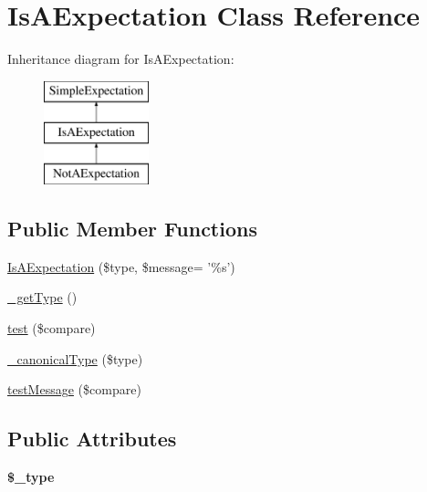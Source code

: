 \hypertarget{class_is_a_expectation}{
\section{IsAExpectation Class Reference}
\label{class_is_a_expectation}
}
Inheritance diagram for IsAExpectation:\begin{figure}[H]
\begin{center}
\leavevmode
\includegraphics[height=3.000000cm]{class_is_a_expectation}
\end{center}
\end{figure}
\subsection*{Public Member Functions}
\begin{DoxyCompactItemize}
\item 
\hyperlink{class_is_a_expectation_a7b8cdc05b6aff778baadf80c6835fba9}{IsAExpectation} (\$type, \$message= '\%s')
\item 
\hyperlink{class_is_a_expectation_adac32cda7734913a99895e0c39461822}{\_\-getType} ()
\item 
\hyperlink{class_is_a_expectation_a759f6a0c54751334dbb7a8aed01a3858}{test} (\$compare)
\item 
\hyperlink{class_is_a_expectation_a3026f90a740bb4ab282b98e22a96d01e}{\_\-canonicalType} (\$type)
\item 
\hyperlink{class_is_a_expectation_af5e73859e22cd3ed97e13edda31de53e}{testMessage} (\$compare)
\end{DoxyCompactItemize}
\subsection*{Public Attributes}
\begin{DoxyCompactItemize}
\item 
\hypertarget{class_is_a_expectation_a2aec053584ae08728c26fcd6678e5654}{
{\bfseries \$\_\-type}}
\label{class_is_a_expectation_a2aec053584ae08728c26fcd6678e5654}

\end{DoxyCompactItemize}


